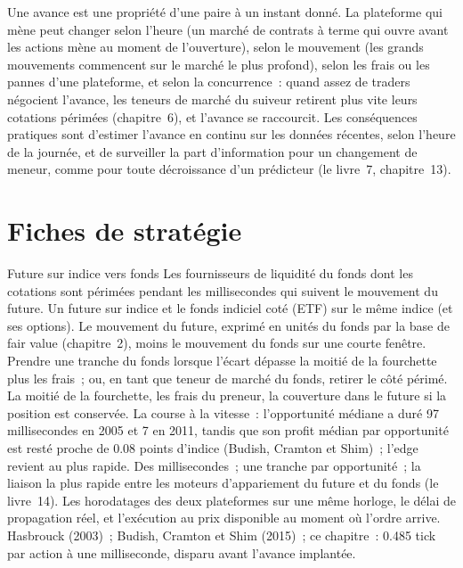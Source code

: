Une avance est une propriété d'une paire à un instant donné. La plateforme qui mène peut changer selon l'heure (un marché de contrats à terme qui ouvre avant les actions mène au
moment de l'ouverture), selon le mouvement (les grands mouvements commencent sur le marché le plus profond), selon les frais ou les pannes d'une plateforme, et selon la concurrence~: quand assez de traders négocient
l'avance, les teneurs de marché du suiveur retirent plus vite leurs cotations périmées (chapitre~6), et l'avance se raccourcit. Les conséquences pratiques sont d'estimer
l'avance en continu sur les données récentes, selon l'heure de la journée, et de surveiller la part d'information pour un changement de meneur, comme pour toute
décroissance d'un prédicteur (le livre~7, chapitre~13).

\section{Fiches de stratégie}

\begin{strategyfile}{Future sur indice vers fonds}\label{strat:hf:lead-lag-and-cross-venue-trading:future}
 Les fournisseurs de liquidité du fonds dont les cotations sont périmées pendant les millisecondes qui suivent le mouvement du future.
 Un future sur indice et le fonds indiciel coté (ETF) sur le même indice (et ses options).
 Le mouvement du future, exprimé en unités du fonds par la base de fair value (chapitre~2), moins le mouvement du fonds sur une courte fenêtre.
 Prendre une tranche du fonds lorsque l'écart dépasse la moitié de la fourchette plus les frais~; ou, en tant que teneur de marché du fonds, retirer le
côté périmé.
 La moitié de la fourchette, les frais du preneur, la couverture dans le future si la position est conservée.
 La course à la vitesse~: l'opportunité médiane a duré 97 millisecondes en 2005 et 7 en 2011, tandis que son profit médian par opportunité
est resté proche de 0.08 points d'indice (Budish, Cramton et Shim)~; l'edge revient au plus rapide.
 Des millisecondes~; une tranche par opportunité~; la liaison la plus rapide entre les
moteurs d'appariement du future et du fonds (le livre~14).
 Les horodatages des deux plateformes sur une même horloge, le délai de propagation réel, et l'exécution au prix disponible au moment où l'ordre
arrive.
 Hasbrouck (2003)~; Budish, Cramton et Shim (2015)~; ce chapitre~: 0.485 tick par action à une milliseconde, disparu avant l'avance implantée.
\end{strategyfile}

